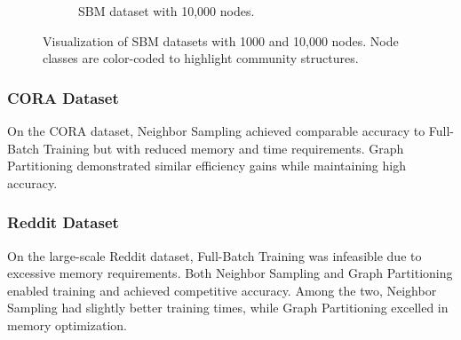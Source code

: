 \documentclass{article}
\begin{document}
\begin{figure}[H]
\begin{subfigure}[b]{0.48\textwidth}
        \caption{SBM dataset with 10,000 nodes.}
        \label{fig:sbm_10000}
    \end{subfigure}
    \caption{Visualization of SBM datasets with 1000 and 10,000 nodes. Node classes are color-coded to highlight community structures.}
    \label{fig:sbm_side_by_side}
\end{figure}

\subsubsection{CORA Dataset}
On the CORA dataset, Neighbor Sampling achieved comparable accuracy to Full-Batch Training but with reduced memory and time requirements. Graph Partitioning demonstrated similar efficiency gains while maintaining high accuracy.

\subsubsection{Reddit Dataset}
On the large-scale Reddit dataset, Full-Batch Training was infeasible due to excessive memory requirements. Both Neighbor Sampling and Graph Partitioning enabled training and achieved competitive accuracy. Among the two, Neighbor Sampling had slightly better training times, while Graph Partitioning excelled in memory optimization.
\end{document}
